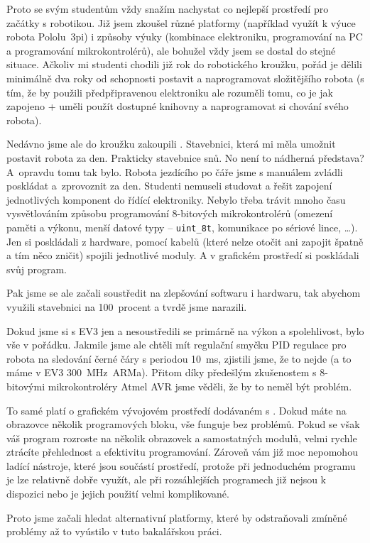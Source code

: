 Proto se svým studentům vždy snažím nachystat co nejlepší prostředí pro začátky s robotikou. 
Již jsem zkoušel různé platformy (například využít k výuce robota Pololu~3pi) i způsoby výuky (kombinace elektroniku, programování na PC a programování mikrokontrolérů), ale bohužel vždy jsem se dostal do stejné situace. 
Ačkoliv mi studenti chodili již rok do robotického kroužku, pořád je dělili minimálně dva roky od schopnosti postavit a naprogramovat složitějšího robota (s tím, že by použili předpřipravenou elektroniku ale rozuměli tomu, co je jak zapojeno + uměli použít dostupné knihovny a naprogramovat si chování svého robota).

Nedávno jsme ale do kroužku zakoupili \legoEV{}. 
Stavebnici, která mi měla umožnit postavit robota za den. 
Prakticky stavebnice snů. No není to nádherná představa?
A~opravdu tomu tak bylo. Robota jezdícího po čáře jsme s manuálem zvládli poskládat a~zprovoznit za den. 
Studenti nemuseli studovat a řešit zapojení jednotlivých komponent do řídící elektroniky. 
Nebylo třeba trávit mnoho času vysvětlováním způsobu programování 8-bitových mikrokontrolérů (omezení paměti a výkonu, menší datové typy -- \verb|uint_8t|, komunikace po sériové lince, \dots).
Jen si poskládali z \lega{ }hardware, pomocí kabelů (které nelze otočit ani zapojit špatně a tím něco zničit) spojili jednotlivé moduly. 
A v grafickém prostředí si poskládali svůj program.

Pak jsme se ale začali soustředit na zlepšování softwaru i hardwaru, tak abychom využili stavebnici na 100~procent a tvrdě jsme narazili.

Dokud jsme si s EV3 jen  a nesoustředili se primárně na výkon a spolehlivost, bylo vše v pořádku. 
Jakmile jsme ale chtěli mít regulační smyčku PID regulace pro robota na sledování černé čáry s periodou 10~ms, zjistili jsme, že to nejde (a to máme v EV3  300~MHz~ARMa). Přitom díky předešlým zkušenostem s 8-bitovými mikrokontroléry Atmel AVR jsme věděli, že by to neměl být problém.

To samé platí o grafickém vývojovém prostředí dodávaném s \EVthree. Dokud máte na obrazovce několik programových bloku, vše funguje bez problémů. 
Pokud se však váš program rozroste na několik obrazovek a samostatných modulů, velmi rychle ztrácíte přehlednost a efektivitu programování.
Zároveň vám již moc nepomohou ladící nástroje, které jsou součástí prostředí, protože při jednoduchém programu je lze relativně dobře využít, ale při rozsáhlejších programech již nejsou k dispozici nebo je jejich použití velmi komplikované. 

Proto jsme začali hledat alternativní platformy, které by odstraňovali zmíněné problémy až to vyústilo v tuto bakalářskou práci.   
